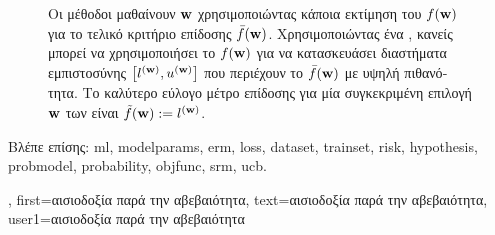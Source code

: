{{\begin{figure}[H]
\begin{center}
			{
			\caption{\foreignlanguage{greek}{Οι μέθοδοι}  \foreignlanguage{greek}{μαθαίνουν}  ${\bf w}$ 
			\foreignlanguage{greek}{χρησιμοποιώντας κάποια εκτίμηση του $f({\bf w})$ για το τελικό κριτήριο
			επίδοσης $\bar{f}({\bf w})$. Χρησιμοποιώντας ένα} , \foreignlanguage{greek}{κανείς μπορεί να 
			χρησιμοποιήσει το $f({\bf w})$ για να κατασκευάσει διαστήματα εμπιστοσύνης 
			$\big[ l^{({\bf w})},  u^{({\bf w})} \big]$ που περιέχουν το $\bar{f}({\bf w})$  
			με υψηλή πιθανότητα. Το καλύτερο εύλογο μέτρο επίδοσης για μία συγκεκριμένη επιλογή ${\bf w}$ των}  
			\foreignlanguage{greek}{είναι} $\tilde{f}({\bf w}) := l^{({\bf w})}$.} }
			\end{center}
		\end{figure}
		\foreignlanguage{greek}{Βλέπε επίσης:} \gls{ml}, \gls{modelparams}, \gls{erm}, \gls{loss}, \gls{dataset}, \gls{trainset}, \gls{risk}, \gls{hypothesis}, 
		\gls{probmodel}, \gls{probability}, \gls{objfunc}, \gls{srm}, \gls{ucb}.},
	first={\foreignlanguage{greek}{αισιοδοξία παρά την αβεβαιότητα}},
	text={\foreignlanguage{greek}{αισιοδοξία παρά την αβεβαιότητα}},
	user1={\foreignlanguage{greek}{αισιοδοξία παρά την αβεβαιότητα}} %
}

